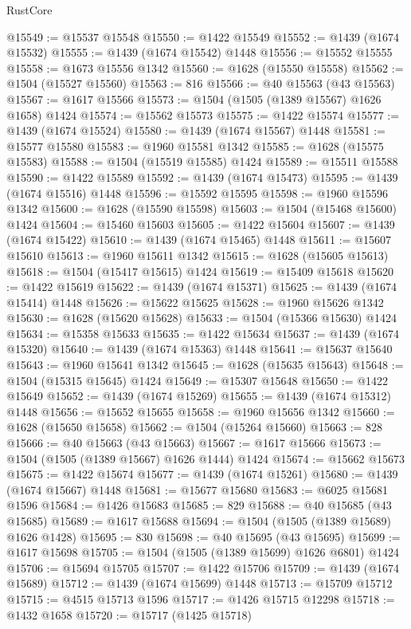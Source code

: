 \begin{lexlean}{RustCore}
\begin{coremodule}
@15549 := @15537 @15548
@15550 := @1422 @15549
@15552 := @1439 (@1674 @15532)
@15555 := @1439 (@1674 @15542) @1448
@15556 := @15552 @15555
@15558 := @1673 @15556 @1342
@15560 := @1628 (@15550 @15558)
@15562 := @1504 (@15527 @15560)
@15563 := 816
@15566 := @40 @15563 (@43 @15563)
@15567 := @1617 @15566
@15573 := @1504 (@1505 (@1389 @15567) @1626 @1658) @1424
@15574 := @15562 @15573
@15575 := @1422 @15574
@15577 := @1439 (@1674 @15524)
@15580 := @1439 (@1674 @15567) @1448
@15581 := @15577 @15580
@15583 := @1960 @15581 @1342
@15585 := @1628 (@15575 @15583)
@15588 := @1504 (@15519 @15585) @1424
@15589 := @15511 @15588
@15590 := @1422 @15589
@15592 := @1439 (@1674 @15473)
@15595 := @1439 (@1674 @15516) @1448
@15596 := @15592 @15595
@15598 := @1960 @15596 @1342
@15600 := @1628 (@15590 @15598)
@15603 := @1504 (@15468 @15600) @1424
@15604 := @15460 @15603
@15605 := @1422 @15604
@15607 := @1439 (@1674 @15422)
@15610 := @1439 (@1674 @15465) @1448
@15611 := @15607 @15610
@15613 := @1960 @15611 @1342
@15615 := @1628 (@15605 @15613)
@15618 := @1504 (@15417 @15615) @1424
@15619 := @15409 @15618
@15620 := @1422 @15619
@15622 := @1439 (@1674 @15371)
@15625 := @1439 (@1674 @15414) @1448
@15626 := @15622 @15625
@15628 := @1960 @15626 @1342
@15630 := @1628 (@15620 @15628)
@15633 := @1504 (@15366 @15630) @1424
@15634 := @15358 @15633
@15635 := @1422 @15634
@15637 := @1439 (@1674 @15320)
@15640 := @1439 (@1674 @15363) @1448
@15641 := @15637 @15640
@15643 := @1960 @15641 @1342
@15645 := @1628 (@15635 @15643)
@15648 := @1504 (@15315 @15645) @1424
@15649 := @15307 @15648
@15650 := @1422 @15649
@15652 := @1439 (@1674 @15269)
@15655 := @1439 (@1674 @15312) @1448
@15656 := @15652 @15655
@15658 := @1960 @15656 @1342
@15660 := @1628 (@15650 @15658)
@15662 := @1504 (@15264 @15660)
@15663 := 828
@15666 := @40 @15663 (@43 @15663)
@15667 := @1617 @15666
@15673 := @1504 (@1505 (@1389 @15667) @1626 @1444) @1424
@15674 := @15662 @15673
@15675 := @1422 @15674
@15677 := @1439 (@1674 @15261)
@15680 := @1439 (@1674 @15667) @1448
@15681 := @15677 @15680
@15683 := @6025 @15681 @1596
@15684 := @1426 @15683
@15685 := 829
@15688 := @40 @15685 (@43 @15685)
@15689 := @1617 @15688
@15694 := @1504 (@1505 (@1389 @15689) @1626 @1428)
@15695 := 830
@15698 := @40 @15695 (@43 @15695)
@15699 := @1617 @15698
@15705 := @1504 (@1505 (@1389 @15699) @1626 @6801) @1424
@15706 := @15694 @15705
@15707 := @1422 @15706
@15709 := @1439 (@1674 @15689)
@15712 := @1439 (@1674 @15699) @1448
@15713 := @15709 @15712
@15715 := @4515 @15713 @1596
@15717 := @1426 @15715 @12298
@15718 := @1432 @1658
@15720 := @15717 (@1425 @15718)

\end{coremodule}
\end{lexlean}
